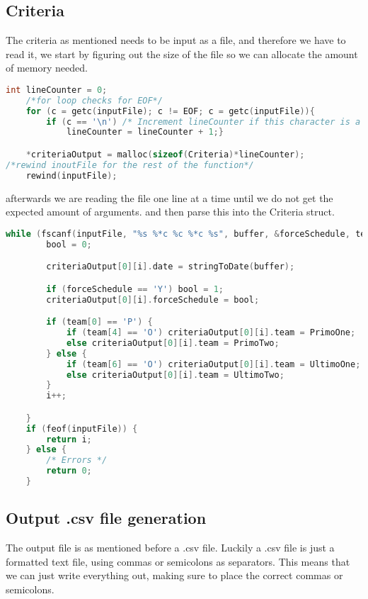 \subsection{Criteria}
The criteria as mentioned needs to be input as a file, and therefore we have to read it, we start by figuring out the size of the file so we can allocate the amount of memory needed.
\begin{lstlisting}[caption={Allocating memory in GenCriteria}, label={lst:GenCriteria_MemoryAllocation},language=C]
    int lineCounter = 0;
    /*for loop checks for EOF*/
    for (c = getc(inputFile); c != EOF; c = getc(inputFile)){
        if (c == '\n') /* Increment lineCounter if this character is a newline*/
            lineCounter = lineCounter + 1;}

    *criteriaOutput = malloc(sizeof(Criteria)*lineCounter);
/*rewind inoutFile for the rest of the function*/
    rewind(inputFile);
\end{lstlisting}
afterwards we are reading the file one line at a time until we do not get the expected amount of arguments. and then parse this into the Criteria struct.
\begin{lstlisting}[caption={Reading file in genCriteria}, label={lst:GenCriteria_FileReading},language=C]
while (fscanf(inputFile, "%s %*c %c %*c %s", buffer, &forceSchedule, team) == 3) {
        bool = 0;

        criteriaOutput[0][i].date = stringToDate(buffer);

        if (forceSchedule == 'Y') bool = 1;
        criteriaOutput[0][i].forceSchedule = bool;

        if (team[0] == 'P') {
            if (team[4] == 'O') criteriaOutput[0][i].team = PrimoOne;
            else criteriaOutput[0][i].team = PrimoTwo;
        } else {
            if (team[6] == 'O') criteriaOutput[0][i].team = UltimoOne;
            else criteriaOutput[0][i].team = UltimoTwo;
        }
        i++;

    }
    if (feof(inputFile)) {
        return i;
    } else {
        /* Errors */
        return 0;
    }
\end{lstlisting}


\subsection{Output .csv file generation}
The output file is as mentioned before a .csv file. Luckily a .csv file is just a formatted text file, using commas or semicolons as separators. This means that we can just write everything out, making sure to place the correct commas or semicolons. 


